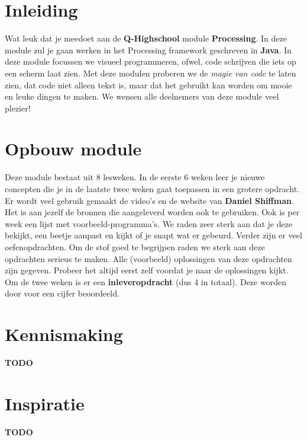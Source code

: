 \documentclass[./syllabus.tex]{subfiles}
\begin{document}
\section{Inleiding}
Wat leuk dat je meedoet aan de \textbf{Q-Highschool} module \textbf{Processing}. In deze module zul je gaan werken in het Processing framework geschreven in \textbf{Java}. In deze module focussen we visueel programmeren, ofwel, code schrijven die iets op een scherm laat zien. Met deze modulen proberen we de \textit{magie van code} te laten zien, dat code niet alleen tekst is, maar dat het gebruikt kan worden om mooie en leuke dingen te maken. We wensen alle deelnemers van deze module veel plezier!

\section{Opbouw module}
Deze module bestaat uit 8 lesweken. In de eerste 6 weken leer je nieuwe concepten die je in de laatste twee weken gaat toepassen in een grotere opdracht. Er wordt veel gebruik gemaakt de video's en de website van \textbf{Daniel Shiffman}. Het is aan jezelf de bronnen die aangeleverd worden ook te gebruiken. Ook is per week een lijst met voorbeeld-programma's. We raden zeer sterk aan dat je deze bekijkt, een beetje aanpast en kijkt of je snapt wat er gebeurd. Verder zijn er veel oefenopdrachten. Om de stof goed te begrijpen raden we sterk aan deze opdrachten serieus te maken. Alle (voorbeeld) oplossingen van deze opdrachten zijn gegeven. Probeer het altijd eerst zelf voordat je naar de oplossingen kijkt. Om de twee weken is er een \textbf{inleveropdracht} (dus 4 in totaal). Deze worden door voor een cijfer beoordeeld.

\section{Kennismaking}
\textbf{TODO}

\section{Inspiratie}
\textbf{TODO}
\end{document}
